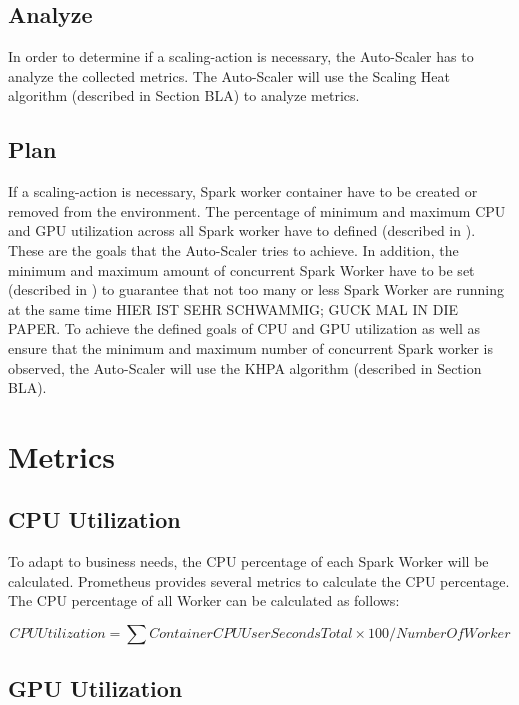 \subsection{Analyze}
In order to determine if a scaling-action is necessary, the Auto-Scaler has to analyze the collected metrics. 
The Auto-Scaler will use the Scaling Heat algorithm (described in Section BLA) to analyze metrics.

\subsection{Plan}
If a scaling-action is necessary, Spark worker container have to be created or removed from the environment. 
The percentage of minimum and maximum CPU and GPU utilization across all Spark worker have to defined (described in ). These are the goals that the Auto-Scaler tries to achieve.
In addition, the minimum and maximum amount of concurrent Spark Worker have to be set (described in ) to guarantee that not too many or less Spark Worker are running at the same time HIER IST SEHR SCHWAMMIG; GUCK MAL IN DIE PAPER.
%
To achieve the defined goals of CPU and GPU utilization as well as ensure that the minimum and maximum number of concurrent Spark worker is observed, the Auto-Scaler will use the KHPA algorithm (described in Section BLA).


\section{Metrics}

\subsection{CPU Utilization}

To adapt to business needs, the CPU percentage of each Spark Worker will be calculated. Prometheus provides several metrics to calculate the CPU percentage. The CPU percentage of all Worker can be calculated as follows:

\begin{equation}
CPUUtilization = \sum ContainerCPUUserSecondsTotal \times 100 / NumberOfWorker
\label{eq:formel}
\end{equation}


\subsection{GPU Utilization}

